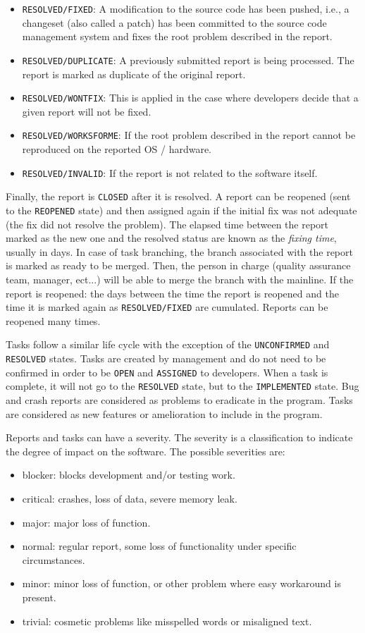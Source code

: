 \begin{itemize}
	\item {\tt RESOLVED/FIXED}: A modification to the source code has been pushed, i.e., a changeset (also called a patch) has been committed to the source code management system and fixes the root problem described in the report.
	\item {\tt RESOLVED/DUPLICATE}: A previously submitted report is being processed. The report is marked as duplicate of the original report.
	\item {\tt RESOLVED/WONTFIX}: This is applied in the case where developers decide that a given report will not be fixed.
	\item {\tt RESOLVED/WORKSFORME}: If the root problem described in the report cannot be reproduced on the reported OS / hardware.
	\item {\tt RESOLVED/INVALID}: If the report is not related to the software itself.
\end{itemize}

Finally, the report is {\tt CLOSED} after it is resolved.
A report can be reopened (sent to the {\tt REOPENED} state) and then assigned again if the initial fix was not adequate (the fix did not resolve the problem).
The elapsed time between the report marked as the new one and the resolved status are known as the {\it fixing time}, usually in days.
In case of task branching, the branch associated with the report is marked as ready to be merged.
Then, the person in charge (quality assurance team, manager, ect...) will be able to merge the branch with the mainline.
If the report is reopened: the days between the time the report is reopened and the time it is marked again as {\tt RESOLVED/FIXED} are cumulated.
Reports can be reopened many times.

Tasks follow a similar life cycle with the exception of the {\tt UNCONFIRMED} and {\tt RESOLVED} states.
Tasks are created by management and do not need to be confirmed in order to be {\tt OPEN} and {\tt ASSIGNED} to developers.
When a task is complete, it will not go to the {\tt RESOLVED} state, but to the {\tt IMPLEMENTED} state.
Bug and crash reports are considered as problems to eradicate in the program.
Tasks are considered as new features or amelioration to include in the program.

Reports and tasks can have a severity\cite{Bettenburg2008}.
The severity is a classification to indicate the degree of  impact on the software.
The possible severities are:

\begin{itemize}
	\item blocker: blocks development and/or testing work.
	\item critical: crashes, loss of data, severe memory leak.
	\item major: major loss of function.
	\item normal: regular report, some loss of functionality under
 specific circumstances.
  \item minor: minor loss of function, or other problem where easy workaround is present.
	\item trivial: cosmetic problems like misspelled words or misaligned text.
\end{itemize}

